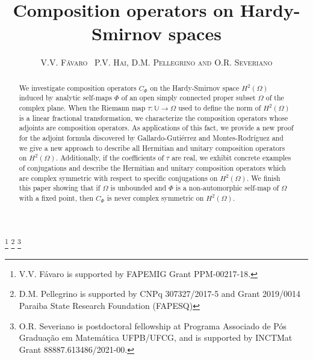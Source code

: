 \documentclass[11pt]{amsart}%
\theoremstyle{definition}
\theoremstyle{remark}
\numberwithin{equation}{section}
\begin{document}
\title[Composition operators on Hardy-Smirnov spaces ]{Composition operators on Hardy-Smirnov spaces }
\author{\textsc{V.V. F\'{a}varo \, P.V. Hai, D.M. Pellegrino and O.R. Severiano }}
\address[V.V. F\'{a}varo]{Faculdade de Matem\'{a}tica, Universidade Federal de
Uberlândia, 38.400-902 - Uberl\^{a}ndia.}
\address[P. V. Hai]{School of Applied Mathematics and Informatics, Hanoi University of Science and Technology, Vien Toan ung dung va Tin hoc, Dai hoc Bach khoa Hanoi, 1 Dai Co Viet, Hanoi, Vietnam.}
\address[D.M. Pellegrino]{ Departamento de Matem\'{a}tica, Universidade Federal da
Para\'{\i}ba, 58.051-900 - Jo\~{a}o Pessoa, Brazil}

\address [O. R. Severiano]{ Programa Associado de P\'{o}s Gradua\c{c}\~{a}o em
Matem\'{a}tica Universidade Federal da Para\'{\i}ba/Universidade Federal
de Campina Grande, João Pessoa, Brazil.}
\thanks{V.V. F\'{a}varo is supported by FAPEMIG Grant PPM-00217-18.}
\thanks{D.M. Pellegrino is supported by CNPq 307327/2017-5 and Grant 2019/0014 Paraiba
State Research Foundation (FAPESQ)}
\thanks{O.R. Severiano is postdoctoral fellowship at Programa Associado de Pós Graduação em Matemática UFPB/UFCG, and is
supported by INCTMat Grant 88887.613486/2021-00. }
\begin{abstract}
We investigate composition operators $C_{\Phi}$ on the Hardy-Smirnov space
$H^{2}(\Omega)$ induced by analytic self-maps $\Phi$ of an open simply connected proper subset $\Omega$ of the complex plane.  When the
Riemann map $\tau:\mathbb{U}\rightarrow\Omega$ used to define the norm of
$H^{2}(\Omega)$ is a linear fractional transformation,
we characterize the composition operators whose adjoints are composition operators. As applications of this fact, we provide a new proof for the adjoint formula 
discovered by Gallardo-Guti\'{e}rrez and Montes-Rodr\'{i}guez and  we give a new approach to describe all Hermitian and unitary composition operators on $H^{2}(\Omega).$
Additionally, if the coefficients of $\tau$ are real, we exhibit concrete examples of
conjugations and describe the Hermitian and unitary composition
operators which are complex symmetric with respect to specific conjugations on
$H^{2}(\Omega).$ We finish this paper showing that if $\Omega$ is unbounded
and $\Phi$ is a non-automorphic self-map of $\Omega$ with a fixed point, then
$C_{\Phi}$ is never complex symmetric on $H^{2}(\Omega).$

\end{abstract}
\maketitle
\tableofcontents
\end{document}
